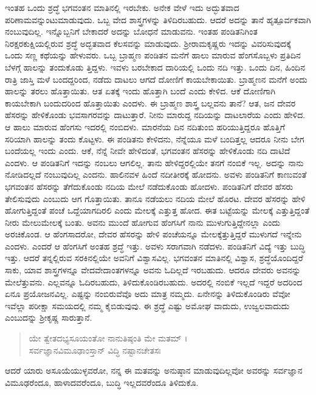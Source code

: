 ಇಂತಹ ಒಂದು ಶ್ರದ್ಧೆ ಭಗವಂತನ ಮಾತಿನಲ್ಲಿ ಇರಬೇಕು. ಅನೇಕ ವೇಳೆ ಇದು ಅದ್ಭುತವಾದ ಪರಿಣಾಮವನ್ನುಂಟುಮಾಡುವುದು. ಒಬ್ಬ ವೇದ ಶಾಸ್ತ್ರಗಳನ್ನು ತಿಳಿದಿರಬಹುದು. ಆದರೆ ಅದನ್ನು ತಾನೆ ಹೃತ್ಪೂರ್ವಕವಾಗಿ ನಂಬುವುದಿಲ್ಲ. ಇನ್ನೊಬ್ಬನಿಗೆ ಬೇಕಾದರೆ ಅದನ್ನು ಬೋಧನೆ ಮಾಡುವನು. ಇಂತಹ ಪಂಡಿತನಿಗಿಂತ ನಿರಕ್ಷರಕುಕ್ಷಿಯಲ್ಲಿರುವ ಶ್ರದ್ಧೆ ಅದ್ಭತವಾದ ಕೆಲಸವನ್ನು ಮಾಡುವುದು. ಶ್ರೀರಾಮಕೃಷ್ಣರು ಇದನ್ನು ವಿವರಿಸುವುದಕ್ಕೆ ಒಂದು ಸಣ್ಣ ಕಥೆಯನ್ನು ಹೇಳುವರು. ಒಬ್ಬ ಬ್ರಾಹ್ಮಣ ಪಂಡಿತನ ಮನೆಗೆ ಹಾಲು ಮಾರುವ ಹೆಂಗಸೊಬ್ಬಳು ಪ್ರತಿದಿನ ಬೆಳಗ್ಗೆ ಹಾಲನ್ನು ತಂದುಕೊಡು ತ್ತಿದ್ದಳು. ಇವಳು ಬರಬೇಕಾದ ದಾರಿಯಲ್ಲಿ ಒಂದು ನದಿ ಇತ್ತು. ಒಂದು ದಿನ, ಹಿಂದಿನ ರಾತ್ರಿ ಜಾಸ್ತಿ ಮಳೆ ಬಂದದ್ದರಿಂದ, ನಡೆದು ದಾಟಲು ಆಗದೆ ದೋಣಿಗೆ ಕಾಯಬೇಕಾಯಿತು. ಬ್ರಾಹ್ಮಣನ ಮನೆಗೆ ಅಂದು ಹಾಲನ್ನು ತರಲು ಹೊತ್ತಾಯಿತು. ಆತ ಏತಕ್ಕೆ ಇಂದು ಹೊತ್ತಾಗಿ ಬಂದೆ ಎಂದು ಕೇಳಿದ. ಆಕೆ ದೋಣಿಗಾಗಿ ಕಾಯಬೇಕಾಗಿ ಬಂದುದರಿಂದ ಹೊತ್ತಾಯಿತು ಎಂದಳು. ಈ ಬ್ರಾಹ್ಮಣ ಶಾಸ್ತ್ರ ಬಲ್ಲವನು ತಾನೆ? ಆತ, ಜನ ದೇವರ ಹೆಸರನ್ನು ಹೇಳಿಕೊಂಡು ಭವಸಾಗರವನ್ನು ದಾಟುತ್ತಾರೆ. ನೀನು ಮಾರುದ್ದ ನದಿಯನ್ನು ದಾಟಲಾರೆಯ ಎಂದು ಹೇಳಿದ. ಆ ಹಾಲು ಮಾರುವ ಹೆಂಗಸು ಇದರಲ್ಲಿ ನಂಬಿದಳು. ಮಾರನೆಯ ದಿನ ನದಿತುಂಬಿ ಹರಿಯುತ್ತಿದ್ದರೂ ಹೊತ್ತಿಗೆ ಸರಿಯಾಗಿ ಹಾಲನ್ನು ತಂದು ಕೊಟ್ಟಳು. ಈ ಪಂಡಿತನು ಕೇಳಿದನು, ನೆನ್ನೆಯೂ ಮಳೆ ಬಂದಿತ್ತಲ್ಲ ಆದರೂ ನೀನು ಬೇಗ ಬಂದೆಯಲ್ಲ ಇಂದು ಎಂದು. ಆಕೆ, ನೆನ್ನೆ ನೀವೇ ಹೇಳಿದಂತೆ, ಭಗವಂತನ ಹೆಸರನ್ನು ಹೇಳಿಕೊಂಡು ನದಿ ದಾಟಿದೆ ಎಂದಳು. ಆ ಪಂಡಿತನಿಗೆ ಇದನ್ನು ನಂಬಲು ಆಗಲಿಲ್ಲ. ತಾನು ಹೇಳಿದ್ದರಲ್ಲಿಯೇ ತನಗೆ ನಂಬಿಕೆ ಇಲ್ಲ. ಅದನ್ನು ನಾನು ನೋಡಿದಲ್ಲದೆ ನಂಬುವುದಿಲ್ಲ ಎಂದನು. ಹಾಲಿನವಳ ಹಿಂದೆ ನದೀತೀರಕ್ಕೆ ಹೋದನು. ಅವಳು ಪಂಡಿತನಿಗೆ ಕಾಣುವಂತೆ ಭಗವಂತನ ಹೆಸರನ್ನು ತೆಗೆದುಕೊಂಡು ನದಿಯ ಮೇಲೆ ನಡೆದುಕೊಂಡು ಹೋದಳು. ಪಂಡಿತನಿಗೆ ದೇವರ ಹೆಸರು ತೇಲಿಸುವುದು ಎಂಬುದು ಆಗ ಗೊತ್ತಾಯಿತು. ತಾನೂ ನಡೆಯಲು ನದಿಯ ಮೇಲೆ ಹೊರಟ. ದೇವರ ಹೆಸರನ್ನು ಹೇಳಿ ಹೋಗುತ್ತಿದ್ದಂತೆ ಪಂಚೆ ಒದ್ದೆಯಾಗದಿರಲಿ ಎಂದು ಮೇಲಕ್ಕೆ ಎತ್ತುತ್ತ ಹೋದ. ಈತ ಬಟ್ಟೆಯನ್ನು ಮೇಲಕ್ಕೆ ಎತ್ತುತ್ತಿದ್ದಂತೆ ನೀರು ಮೇಲುಮೇಲಕ್ಕೆ ಬಂತು. ಅವನು ಮುಂದೆ ಹೋಗುವ ಹೆಂಗಸಿಗೆ ನಾನು ಮುಳುಗುತ್ತಿದ್ದೇನಲ್ಲಾ ಎಂದು ಅರಚಿಕೊಂಡ. ಆ ಹೆಂಗಸಾದರೋ, ದೇವರ ಹೆಸರನ್ನು ಹೇಳಿ ಪಂಚೆಯನ್ನೂ ಮೇಲಕ್ಕೆತ್ತುತ್ತಿದ್ದರೆ ಮುಳುಗದೆ ಇನ್ನೇನು ಎಂದಳು. ಎಂದರೆ ಆ ಹೆಂಗಸಿಗೆ ಅಂತಹ ಶ್ರದ್ಧೆ ಇತ್ತು. ಅವಳು ಸರಾಗವಾಗಿ ನಡೆದಳು. ಪಂಡಿತನಿಗೆ ವಿದ್ಯೆ ಇತ್ತು ಬುದ್ಧಿ ಇತ್ತು. ಆದರೆ ತನ್ನಲ್ಲಿರುವ ಸರಕಿನಲ್ಲಿಯೇ ಅವನಿಗೆ ವಿಶ್ವಾಸವಿಲ್ಲ. ಭಗವಂತನ ಮಾತಿನಲ್ಲಿ ವಿಶ್ವಾಸ, ಶ್ರದ್ಧೆಯೊಂದಿದ್ದರೆ ಸಾಕು, ಯಾವ ಶಾಸ್ತ್ರಗಳನ್ನೂ ವೇದವೇದಾಂತಗಳನ್ನೂ ಅವನು ಓದಿಲ್ಲದೆ ಇರಬಹುದು. ಆದರೂ ದೇವರು ಅವನನ್ನು ಮೇಲೆತ್ತುವನು. ಎಲ್ಲವನ್ನೂ ಓದಿರಬಹುದು, ತಿಳಿದುಕೊಂಡಿರಬಹುದು. ಅದರಲ್ಲಿ ನಂಬಿಕೆ ಇಲ್ಲದೆ ಇದ್ದರೆ ಅದರಿಂದ ಏನೂ ಪ್ರಯೋಜನವಿಲ್ಲ. ಎಷ್ಟನ್ನು ನಂಬಿರುವೆವೊ ಅದು ಮಾತ್ರ ನಮ್ಮದು. ಏನೇನನ್ನು ತಿಳಿದುಕೊಂಡಿರು ವೆವೋ ಇವೆಲ್ಲಾ ಪರೀಕ್ಷಾ ಸಮಯದಲ್ಲಿ ನಮ್ಮ ಕೈಬಿಡುವುವು. ಈ ಶ್ರದ್ಧೆ ಎಷ್ಟು ಅಮೋಘ ವಾದುದು, ಉಜ್ವಲವಾದುದು ಎಂಬುದನ್ನು ಶ್ರೀಕೃಷ್ಣ ಸಾರುತ್ತಾನೆ.

\begin{verse}
ಯೇ ತ್ವೇತದಭ್ಯಸೂಯಂತೋ ನಾನುತಿಷ್ಠಂತಿ ಮೇ ಮತಮ್ ।\\ಸರ್ವಜ್ಞಾನವಿಮೂಢಾಂಸ್ತಾನ್ ವಿದ್ಧಿ ನಷ್ಟಾನಚೇತಸಃ 
\end{verse}

{\small ಆದರೆ ಯಾರು ಅಸೂಯೆಯುಳ್ಳವರೋ, ನನ್ನ ಈ ಮತವನ್ನು ಅನುಷ್ಠಾನ ಮಾಡುವುದಿಲ್ಲವೋ ಅವರನ್ನು ಸರ್ವಜ್ಞಾನ ವಿಮೂಢರೆಂದೂ, ಹಾಳಾದವರೆಂದೂ, ಬುದ್ಧಿ ಇಲ್ಲದವರೆಂದೂ ತಿಳಿದುಕೊ.}


